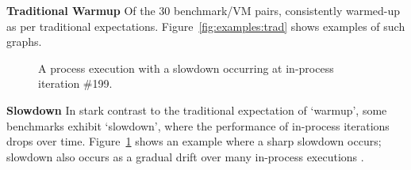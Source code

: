 \documentclass[a4paper,UKenglish]{lipics}
\begin{document}
\textbf{Traditional Warmup}
Of the 30  benchmark/VM pairs,  consistently warmed-up as
per traditional expectations. Figure~\ref{fig:examples:trad} shows examples of
such graphs.


\begin{figure}[tbp]
\caption{A process execution with a slowdown occurring at in-process iteration
\#199.}
\label{fig:examples:slowdown1}
\end{figure}

\textbf{Slowdown} \label{sub:slowdowns}
In stark contrast to the traditional expectation of `warmup', some benchmarks
 exhibit `slowdown', where the performance of
in-process iterations drops over time. Figure~\ref{fig:examples:slowdown1} shows
an example where a sharp slowdown occurs; slowdown also occurs as a gradual
drift over many in-process executions .
\end{document}
